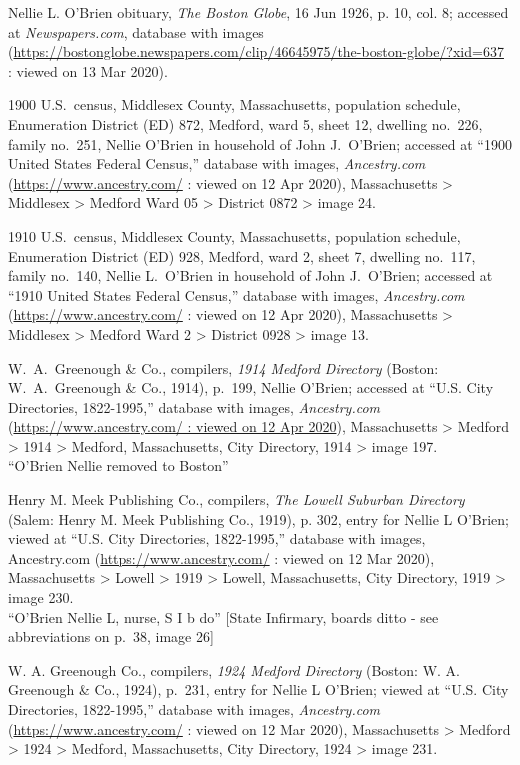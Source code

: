 \begin{thebibliography}{999}
	Nellie L. O’Brien obituary, \textit{The Boston Globe}, 16 Jun 1926, p. 10, col. 8; accessed at \textit{Newspapers.com}, database with images (\url{https://bostonglobe.newspapers.com/clip/46645975/the-boston-globe/?xid=637} : viewed on 13 Mar 2020). 
	
	1900 U.S.\ census, Middlesex County, Massachusetts, population schedule, Enumeration District (ED) 872, Medford, ward 5, sheet 12, dwelling no.\ 226, family no.\ 251, Nellie O'Brien in household of John J.\ O'Brien; accessed at ``1900 United States Federal Census,'' database with images, \textit{Ancestry.com} (\url{https://www.ancestry.com/} : viewed on 12 Apr 2020), Massachusetts > Middlesex > Medford Ward 05 > District 0872 > image 24.
	
	1910 U.S.\ census, Middlesex County, Massachusetts, population schedule, Enumeration District (ED) 928, Medford, ward 2, sheet 7, dwelling no.\ 117, family no.\ 140, Nellie L.\ O'Brien in household of John J.\ O'Brien; accessed at ``1910 United States Federal Census,'' database with images, \textit{Ancestry.com} (\url{https://www.ancestry.com/} : viewed on 12 Apr 2020), Massachusetts > Middlesex > Medford Ward 2 > District 0928 > image 13.
	
	W.\ A.\ Greenough \& Co., compilers, \textit{1914 Medford Directory} (Boston: W.\ A.\ Greenough \& Co., 1914), p.\ 199, Nellie O'Brien; accessed at ``U.S. City Directories, 1822-1995,'' database with images, \textit{Ancestry.com} (\url{https://www.ancestry.com/ : viewed on 12 Apr 2020}), Massachusetts > Medford > 1914 > Medford, Massachusetts, City Directory, 1914 > image 197.\\
	``O'Brien Nellie removed to Boston''
	
	Henry M. Meek Publishing Co., compilers, \textit{The Lowell Suburban Directory} (Salem: Henry M. Meek Publishing Co., 1919), p. 302, entry for Nellie L O'Brien; viewed at ``U.S. City Directories, 1822-1995,'' database with images, Ancestry.com (\url{https://www.ancestry.com/} : viewed on 12 Mar 2020), Massachusetts > Lowell > 1919 > Lowell, Massachusetts, City Directory, 1919 > image 230.\\
	``O'Brien Nellie L, nurse, S I b do'' [State Infirmary, boards ditto - see abbreviations on p.\ 38, image 26]
	
	W. A. Greenough Co., compilers, \textit{1924 Medford Directory} (Boston: W. A. Greenough \& Co., 1924), p.\ 231, entry for Nellie L O'Brien; viewed at ``U.S. City Directories, 1822-1995,'' database with images, \textit{Ancestry.com} (\url{https://www.ancestry.com/} : viewed on 12 Mar 2020), Massachusetts > Medford > 1924 > Medford, Massachusetts, City Directory, 1924 > image 231.
	

\end{thebibliography}
